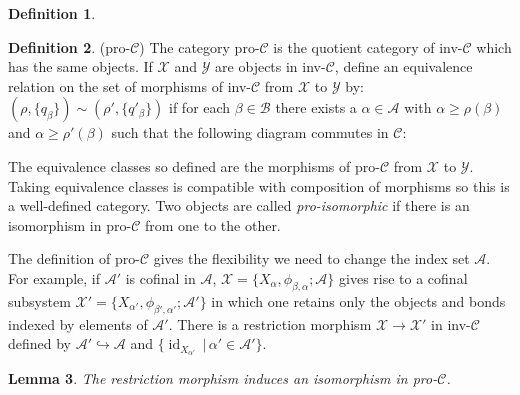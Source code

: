 \documentclass[a4paper,11pt]{article}
\theoremstyle{definition}
\newtheorem{definition}{Definition}[section]
\theoremstyle{plain}
\newtheorem{lemma}[definition]{Lemma}
\theoremstyle{remark}
\DeclareMathOperator{\id}{id}
\begin{document}
{\begin{definition}
\end{definition}

\begin{definition} (pro-$\mathcal{C}$) The category pro-$\mathcal{C}$ is the quotient category of inv-$\mathcal{C}$ which has the same objects. If $\mathcal{X}$ and $\mathcal{Y}$ are objects in inv-$\mathcal{C}$, define an equivalence relation on the set of morphisms of inv-$\mathcal{C}$ from $\mathcal{X}$ to $\mathcal{Y}$ by: $( \rho, \{q_{\beta}\}) \sim ( \rho', \{q'_{\beta}\})$ if for each $\beta\in \mathcal{B}$ there exists a $\alpha\in \mathcal{A}$ with $\alpha \geq  \rho(\beta)$ and $\alpha\geq  \rho'(\beta)$ such that the following diagram commutes in $\mathcal{C}$:




\begin{figure}[H]
\center
{}
 \end{figure}
 
 The equivalence classes so defined are the morphisms of pro-$\mathcal{C}$ from $\mathcal{X}$ to $\mathcal{Y}$. Taking equivalence classes is compatible with composition of morphisms so this is a well-defined category. Two objects are called \textit{pro-isomorphic} if there is an isomorphism in pro-$\mathcal{C}$ from one to the other.  

\end{definition}

The definition of pro-$\mathcal{C}$ gives the flexibility we need to change the index set $\mathcal{A}$. For example, if $\mathcal{A'}$ is cofinal in $\mathcal{A}$, $\mathcal{X}= \{X_{\alpha},\phi_{\beta,\alpha}; \mathcal{A}\}$ gives rise to a cofinal subsystem $\mathcal{X}'=\{X_{\alpha'}, \phi_{\beta',\alpha'}; \mathcal{A}'\}$ in which one retains only the objects and bonds indexed by elements of $\mathcal{A}'$. There is a restriction morphism $\mathcal{X}\rightarrow \mathcal{X}'$ in inv-$\mathcal{C}$ defined by $\mathcal{A'}\hookrightarrow \mathcal{A}$ and $\{\id_{X_{\alpha'}}\,|\,\alpha'\in \mathcal{A}'\}$. 

\begin{lemma} The restriction morphism induces an isomorphism in pro-$\mathcal{C}$.
\end{lemma}

}
\end{document}
